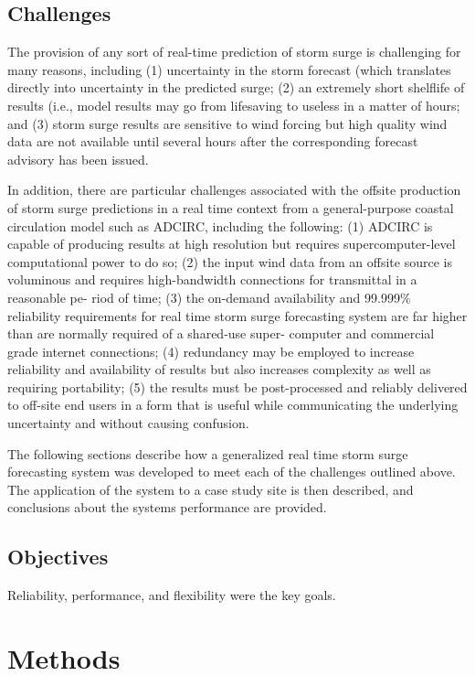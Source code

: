 \documentclass[12pt]{article}
\begin{document}
\subsection{Challenges}

The provision of any sort of real-time prediction of storm surge is 
challenging for many reasons, including (1) uncertainty in the storm 
forecast (which translates directly into uncertainty in the 
predicted surge; (2) an extremely short shelflife of results (i.e., 
model results may go from lifesaving to useless in a matter of 
hours; and (3) storm surge results are sensitive to wind forcing but 
high quality wind data are not available until several hours after 
the corresponding forecast advisory has been issued. 

In addition, there are particular challenges associated with the 
offsite production of storm surge predictions in a real time context 
from a general-purpose coastal circulation model such as ADCIRC, 
including the following: (1) ADCIRC is capable of producing results 
at high resolution but requires supercomputer-level computational 
power to do so; (2) the input wind data from an offsite source is 
voluminous and requires high-bandwidth connections for transmittal 
in a reasonable pe- riod of time; (3) the on-demand availability and 
99.999\% reliability requirements for real time storm surge 
forecasting system are far higher than are normally required of a 
shared-use super- computer and commercial grade internet 
connections; (4) redundancy may be employed to increase reliability 
and availability of results but also increases complexity as well as 
requiring portability; (5) the results must be post-processed and 
reliably delivered to off-site end users in a form that is useful 
while communicating the underlying uncertainty and without causing 
confusion. 

The following sections describe how a generalized real time storm 
surge forecasting system was developed to meet each of the 
challenges outlined above. The application of the system to a case 
study site is then described, and conclusions about the systems 
performance are provided.

\subsection{Objectives}

Reliability, performance, and flexibility were the key goals. 

\section{Methods}
\end{document}
